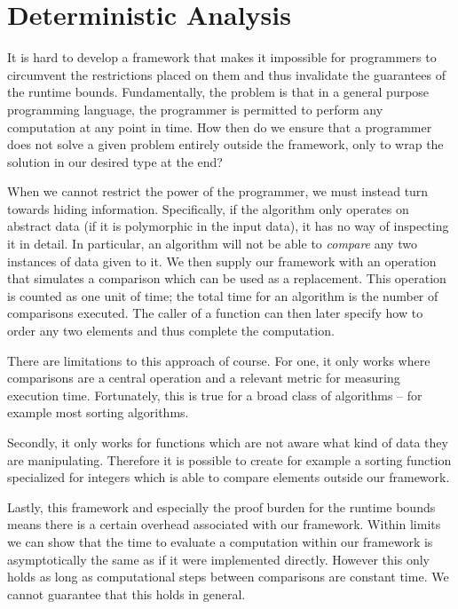 
\chapter{Deterministic Analysis}
\label{ch:detanalysis}
It is hard to develop a framework that makes it impossible for programmers to circumvent the restrictions placed on them and thus invalidate the guarantees of the runtime bounds. Fundamentally, the problem is that in a general purpose programming language, the programmer is permitted to perform any computation at any point in time. How then do we ensure that a programmer does not solve a given problem entirely outside the framework, only to wrap the solution in our desired type at the end?

When we cannot restrict the power of the programmer, we must instead turn towards hiding information. Specifically, if the algorithm only operates on abstract data (if it is polymorphic in the input data), it has no way of inspecting it in detail. In particular, an algorithm will not be able to \emph{compare} any two instances of data given to it. We then supply our framework with an operation that simulates a comparison which can be used as a replacement. This operation is counted as one unit of time; the total time for an algorithm is the number of comparisons executed. The caller of a function can then later specify how to order any two elements and thus complete the computation.

There are limitations to this approach of course. For one, it only works where comparisons are a central operation and a relevant metric for measuring execution time. Fortunately, this is true for a broad class of algorithms -- for example most sorting algorithms.

Secondly, it only works for functions which are not aware what kind of data they are manipulating. Therefore it is possible to create for example a sorting function specialized for integers which is able to compare elements outside our framework.

Lastly, this framework and especially the proof burden for the runtime bounds means there is a certain overhead associated with our framework. Within limits we can show that the time to evaluate a computation within our framework is asymptotically the same as if it were implemented directly. However this only holds as long as computational steps between comparisons are constant time. We cannot guarantee that this holds in general.

